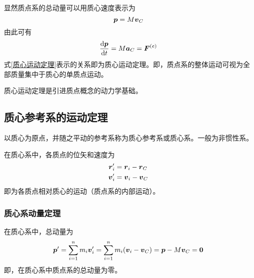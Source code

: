 显然质点系的总动量可以用质心速度表示为
\begin{equation*}
	\boldsymbol{p} = M\boldsymbol{v}_C
\end{equation*}
由此可有
\begin{equation}
	\frac{\mathrm{d} \boldsymbol{p}}{\mathrm{d} t} = M\boldsymbol{a}_C = \boldsymbol{F}^{(e)}
	\label{质心运动定理}
\end{equation}
式\eqref{质心运动定理}表示的关系即为{\heiti 质心运动定理}。即，质点系的整体运动可视为全部质量集中于质心的单质点运动。

质心运动定理是引进质点概念的动力学基础。

\subsection{质心参考系的运动定理}

以质心为原点，并随之平动的参考系称为{\heiti 质心参考系}或{\heiti 质心系}。一般为非惯性系。

在质心系中，各质点的位矢和速度为
\begin{align}
	\boldsymbol{r}'_i & = \boldsymbol{r}_i - \boldsymbol{r}_C \\
	\boldsymbol{v}'_i & = \boldsymbol{v}_i - \boldsymbol{v}_C
\end{align}
即为各质点相对质心的运动（质点系的内部运动）。

\subsubsection{质心系动量定理}

在质心系中，总动量为
\begin{equation}
	\boldsymbol{p}' = \sum_{i=1}^n m_i \boldsymbol{v}'_i = \sum_{i=1}^n m_i(\boldsymbol{v}_i - \boldsymbol{v}_C) = \boldsymbol{p} - M\boldsymbol{v}_C = \boldsymbol{0}
\end{equation}
即，在质心系中质点系的总动量为零。

